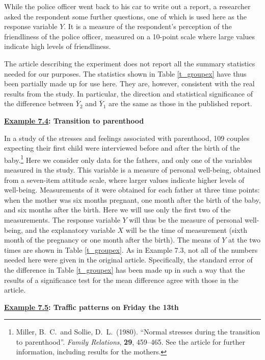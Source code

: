 While the police officer went back to his car to write out a report, a
researcher asked the respondent some further
questions, one of which is used here as the response variable $Y$. It
is a measure of the respondent's perception of the friendliness of the
police officer, measured on a 10-point scale where large values indicate
high levels of friendliness.

The article describing the experiment does not report all the summary
statistics needed for our purposes. The statistics shown
in Table \ref{t_groupex} have thus been partially made up for use here. They are,
however, consistent with the real results from the study. In particular,
the direction and statistical significance of the difference between
$\bar{Y}_{2}$ and $\bar{Y}_{1}$ are the same as those in the published
report.

\newpage
\label{p_dependentex}
\textbf{\underline{Example 7.4}: Transition to parenthood}

In a study of the stresses and feelings associated with parenthood, 109
couples expecting their first child were interviewed before and after the
birth of the baby.\footnote{Miller, B.\ C.\ and Sollie, D.\ L.\ (1980).
``Normal stresses during the transition to parenthood''. \emph{Family
Relations}, \textbf{29}, 459--465. See the article for further
information, including results for the mothers.} Here we consider only
data for the fathers, and only one of the variables measured in the
study. This variable is a measure of personal well-being, obtained from
a seven-item attitude scale, where larger values indicate higher levels
of well-being.
Measurements of it were obtained for each
father at three time points: when the mother was six months pregnant,
one month after the birth of the baby, and six months after the birth.
Here we will use only the first two of the measurements. The response
variable $Y$ will thus be the measure of personal well-being, and the
explanatory variable $X$ will be the time of measurement (sixth month of
the pregnancy or one month after the birth). The means of $Y$ at the two
times are shown in Table \ref{t_groupex}. As in Example 7.3, not all of
the numbers needed here were given in the original article.
Specifically, the standard error of the difference in Table
\ref{t_groupex} has been made up in such a way that the results of a
significance test for the mean difference agree with those in the article.

\textbf{\underline{Example 7.5}: Traffic patterns on Friday the 13th}


